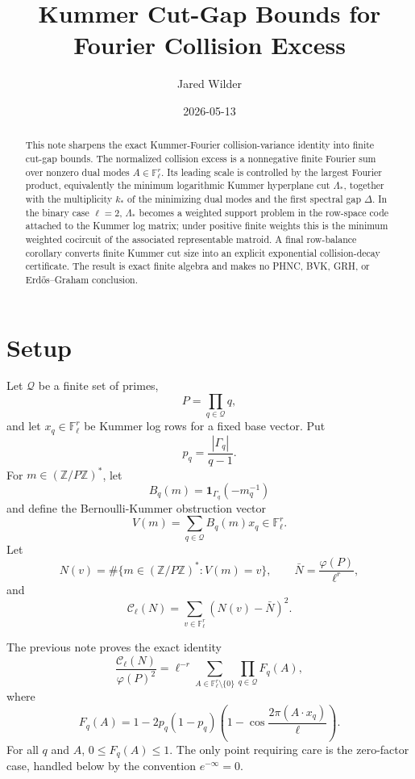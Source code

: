 \documentclass[11pt]{article}
\title{Kummer Cut-Gap Bounds for Fourier Collision Excess}
\author{Jared Wilder}
\date{2026-05-13}
\newcommand{\Z}{\mathbb Z}
\newcommand{\F}{\mathbb F}
\newcommand{\one}{\mathbf 1}
\begin{document}
\maketitle

\begin{abstract}
This note sharpens the exact Kummer-Fourier collision-variance identity into finite cut-gap bounds.  The normalized collision excess is a nonnegative finite Fourier sum over nonzero dual modes \(A\in\F_\ell^r\).  Its leading scale is controlled by the largest Fourier product, equivalently the minimum logarithmic Kummer hyperplane cut \(\Lambda_*\), together with the multiplicity \(k_*\) of the minimizing dual modes and the first spectral gap \(\Delta\).  In the binary case \(\ell=2\), \(\Lambda_*\) becomes a weighted support problem in the row-space code attached to the Kummer log matrix; under positive finite weights this is the minimum weighted cocircuit of the associated representable matroid.  A final row-balance corollary converts finite Kummer cut size into an explicit exponential collision-decay certificate.  The result is exact finite algebra and makes no PHNC, BVK, GRH, or Erd\H{o}s--Graham conclusion.
\end{abstract}

\section{Setup}

Let \(\mathcal Q\) be a finite set of primes,
\[
P=\prod_{q\in\mathcal Q}q,
\]
and let \(x_q\in\F_\ell^r\) be Kummer log rows for a fixed base vector.  Put
\[
p_q=\frac{|\Gamma_q|}{q-1}.
\]
For \(m\in(\Z/P\Z)^*\), let
\[
B_q(m)=\one_{\Gamma_q}(-m_q^{-1})
\]
and define the Bernoulli-Kummer obstruction vector
\[
V(m)=\sum_{q\in\mathcal Q}B_q(m)x_q\in\F_\ell^r.
\]
Let
\[
N(v)=\#\{m\in(\Z/P\Z)^*:V(m)=v\},
\qquad
\bar N=\frac{\varphi(P)}{\ell^r},
\]
and
\[
\mathcal C_\ell(N)=\sum_{v\in\F_\ell^r}(N(v)-\bar N)^2.
\]

The previous note proves the exact identity
\begin{equation}\label{E:paper8-identity}
\frac{\mathcal C_\ell(N)}{\varphi(P)^2}
=
\ell^{-r}\sum_{A\in\F_\ell^r\setminus\{0\}}
\prod_{q\in\mathcal Q}F_q(A),
\end{equation}
where
\begin{equation}\label{E:local-factor}
F_q(A)=
1-2p_q(1-p_q)
\left(1-\cos\frac{2\pi(A\cdot x_q)}{\ell}\right).
\end{equation}
For all \(q\) and \(A\), \(0\le F_q(A)\le1\).  The only point requiring care is the zero-factor case, handled below by the convention \(e^{-\infty}=0\).
\end{document}
